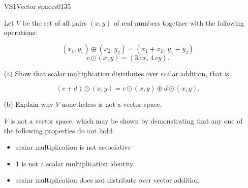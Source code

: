 \begin{exercise}{VS1}{Vector spaces}{0135} 
\begin{exerciseStatement} 

 Let \(V\) be the set of all pairs \((x,y)\) of real numbers together with the following operations: 

 \[(x_1,y_1)\oplus (x_2,y_2)=\left(x_{1} + x_{2},\,y_{1} + y_{2}\right)\]\[c \odot (x,y) =\left(3 \, c x,\,4 \, c y\right).\] 

 (a) Show that scalar multiplication distributes over scalar addition, that is: 

 \[
      (c+d)\odot(x,y)=c\odot(x,y)\oplus d\odot (x,y).
    \] 

 (b) Explain why \(V\) nonetheless is not a vector space. 

 \end{exerciseStatement}
 \begin{exerciseAnswer} 

 \(V\) is not a vector space, which may be shown by demonstrating that any one of the following properties do not hold: 

 

\begin{itemize}
\item scalar multiplication is not associative
\item 1 is not a scalar multiplication identity
\item scalar multiplication does not distribute over vector addition
\end{itemize}

     \end{exerciseAnswer}
 \end{exercise}


\newpage




